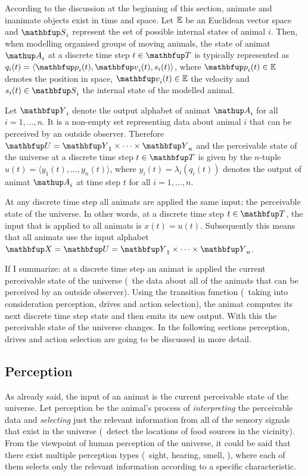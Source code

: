 According to the discussion at the beginning of this section, animate and inanimate objects exist in time and space. Let $\mathbb{E}$ be an Euclidean vector space and $\set{S}_i$ represent the set of possible internal states of animal $i$. Then, when modelling organised groups of moving animals, the state of animat $\autom{A}_i$ at a discrete time step $t \in \set{T}$ is typically represented as $q_i(t)=\langle \vect{p}_i(t), \vect{v}_i(t), s_i(t) \rangle$, where $\vect{p}_i(t) \in \E$ denotes the position in space, $\vect{v}_i(t) \in \E$ the velocity and $s_i(t) \in \set{S}_i$ the internal state of the modelled animal. 

Let $\set{Y}_i$ denote the output alphabet of animat $\autom{A}_i$ for all $i=1,\ldots,n$. It is a non-empty set representing data about animal $i$ that can be perceived by an outside observer. Therefore $\set{U}=\set{Y}_1 \times \cdots \times \set{Y}_n$ and the perceivable state of the universe at a discrete time step $t \in \set{T}$ is given by the $n$-tuple $u(t)=\langle y_1(t),\ldots,y_n(t)\rangle$, where $y_i(t)=\lambda_i(q_i(t))$ denotes the output of animat $\autom{A}_i$ at time step $t$ for all $i=1,\ldots,n$. 

At any discrete time step all animats are applied the same input; the perceivable state of the universe. In other words, at a discrete time step $t \in \set{T}$, the input that is applied to all animats is $x(t)=u(t)$. Subsequently this means that all animats use the input alphabet $\set{X}=\set{U}=\set{Y}_1 \times \cdots \times \set{Y}_n$.

If I summarize: at a discrete time step an animat is applied the current perceivable state of the universe (\ie\ the data about all of the animats that can be perceived by an outside observer). Using the transition function (\ie\ taking into consideration perception, drives and action selection), the animat computes its next discrete time step state and then emits its new output. With this the perceivable state of the universe changes. In the following sections perception, drives and action selection are going to be discussed in more detail.

\subsection{Perception}
As already said, the input of an animat is the current perceivable state of the universe. Let perception be the animal's process of \emph{interpreting} the perceivable data and \emph{selecting} just the relevant information from all of the sensory signals that exist in the universe (\eg\ detect the locations of food sources in the vicinity). From the viewpoint of human perception of the universe, it could be said that there exist multiple perception types (\ie\ sight, hearing, smell, \etc), where each of them selects only the relevant information according to a specific characteristic. 

